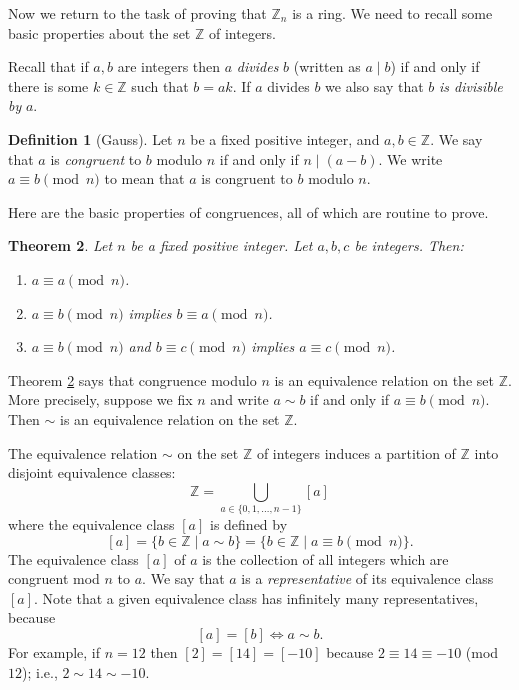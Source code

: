 \documentclass[11pt]{article}
\newtheorem{thm}{Theorem}[section]
\theoremstyle{definition}
\newtheorem{defn}[thm]{Definition}
\newcommand{\Z}{\mathbb{Z}} %
\renewcommand{\iff}{\Leftrightarrow}
\begin{document}
Now we return to the task of proving that $\Z_n$ is a ring. We need to
recall some basic properties about the set $\Z$ of integers.

Recall that if $a,b$ are integers then $a$ \emph{divides} $b$ (written
as $a \mid b$) if and only if there is some $k \in \Z$ such that $b =
ak$.  If $a$ divides $b$ we also say that $b$ \emph{is divisible by}
$a$.

\begin{defn}[Gauss]
  Let $n$ be a fixed positive integer, and $a,b \in \Z$.  We say that
  $a$ is \emph{congruent} to $b$ modulo $n$ if and only if $n \mid
  (a-b)$. We write $a \equiv b \pmod{n}$ to mean that $a$ is congruent
  to $b$ modulo $n$.
\end{defn}

Here are the basic properties of congruences, all of which are routine
to prove.

\begin{thm} \label{thm:cong-prop-1}
Let $n$ be a fixed positive integer. Let $a, b, c$ be integers. Then:
\begin{enumerate}
  \item $a \equiv a \pmod{n}$.

  \item $a \equiv b \pmod{n}$ implies $b \equiv a \pmod{n}$.

  \item $a \equiv b \pmod{n}$ and $b \equiv c \pmod{n}$ implies $a
    \equiv c \pmod{n}$.
\end{enumerate}
\end{thm}


Theorem \ref{thm:cong-prop-1} says that congruence modulo $n$ is an
equivalence relation on the set $\Z$. More precisely, suppose we fix
$n$ and write $a \sim b$ if and only if $a \equiv b \pmod{n}$. Then
$\sim$ is an equivalence relation on the set $\Z$.

The equivalence relation $\sim$ on the set $\Z$ of integers induces a
partition of $\Z$ into disjoint equivalence classes:
\[
  \Z = \bigcup_{a \in \{0,1,\dots, n-1\}} [a]
\] 
where the equivalence class $[a]$ is defined by 
\[
   [a] = \{ b \in \Z \mid a \sim b \} = \{b \in \Z \mid a \equiv b
   \pmod{n} \}.
\]
The equivalence class $[a]$ of $a$ is the collection of all integers
which are congruent mod $n$ to $a$. We say that $a$ is a
\emph{representative} of its equivalence class $[a]$. Note that a
given equivalence class has infinitely many representatives, because
\[
  [a] = [b] \iff a \sim b.
\]
For example, if $n=12$ then $[2] = [14] = [-10]$ because $2 \equiv 14
\equiv -10$ (mod $12$); i.e., $2 \sim 14 \sim -10$. 
\end{document}
